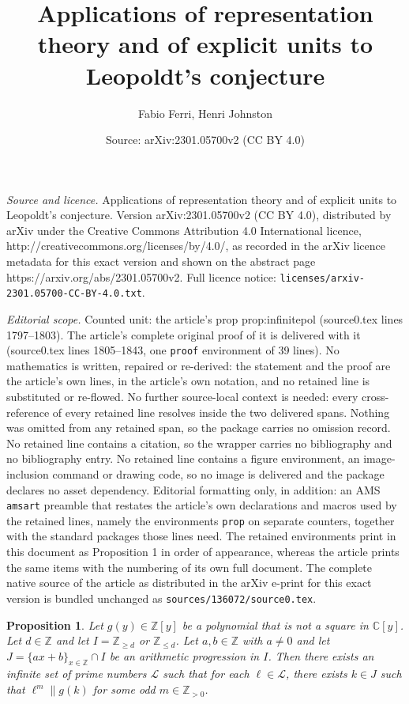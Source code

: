 \documentclass[10pt,a4paper]{amsart}
\title{Applications of representation theory and of explicit units to Leopoldt's conjecture}
\author{Fabio Ferri, Henri Johnston}
\date{Source: arXiv:2301.05700v2 (CC BY 4.0)}
\newtheorem{prop}{Proposition}
\newcommand{\C}{\mathbb{C}}
\newcommand{\Z}{\mathbb{Z}}
\begin{document}
\maketitle

\noindent\emph{Source and licence.} Applications of representation theory and of explicit units to Leopoldt's conjecture. Version arXiv:2301.05700v2 (CC BY 4.0), distributed by arXiv under the Creative Commons Attribution 4.0 International licence, http://creativecommons.org/licenses/by/4.0/, as recorded in the arXiv licence metadata for this exact version and shown on the abstract page https://arxiv.org/abs/2301.05700v2. Full licence notice: \texttt{licenses/arxiv-2301.05700-CC-BY-4.0.txt}.\par\smallskip

\noindent\textit{Editorial scope.} Counted unit: the article's prop prop:infinitepol (source0.tex lines 1797--1803). The article's complete original proof of it is delivered with it (source0.tex lines 1805--1843, one \texttt{proof} environment of 39 lines). No mathematics is written, repaired or re-derived: the statement and the proof are the article's own lines, in the article's own notation, and no retained line is substituted or re-flowed.  No further source-local context is needed: every cross-reference of every retained line resolves inside the two delivered spans.  Nothing was omitted from any retained span, so the package carries no omission record.  No retained line contains a citation, so the wrapper carries no bibliography and no bibliography entry.  No retained line contains a figure environment, an image-inclusion command or drawing code, so no image is delivered and the package declares no asset dependency.  Editorial formatting only, in addition: an AMS \texttt{amsart} preamble that restates the article's own declarations and macros used by the retained lines, namely the environments \texttt{prop} on separate counters, together with the standard packages those lines need.  The retained environments print in this document as Proposition 1 in order of appearance, whereas the article prints the same items with the numbering of its own full document.  The complete native source of the article as distributed in the arXiv e-print for this exact version is bundled unchanged as \texttt{sources/136072/source0.tex}.
\begin{prop}\label{prop:infinitepol}
Let $g(y)\in\Z[y]$ be a polynomial that is not a square in $\C[y]$. 
Let $d \in \Z$ and let $I=\Z_{\geq d}$ or $\Z_{\leq d}$.
Let $a,b \in \Z$ with $a \neq 0$ and let $J=\{ ax+b \}_{x \in \Z} \cap I$ be an arithmetic progression in $I$.
Then there exists an infinite set of prime numbers $\mathcal L$ such that for each $\ell \in\mathcal L$, 
there exists $k \in J$ such that $\ell^{m} \parallel g(k)$ for some odd $m \in \Z_{>0}$.
\end{prop}
\end{document}
